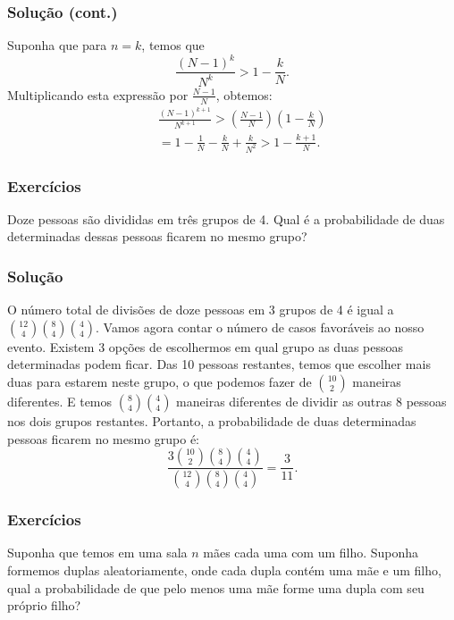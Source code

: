 \begin{frame}
\frametitle{\textbf{Solução (cont.)}}
\baselineskip=13pt

Suponha que para $n=k$, temos que
$$\frac{(N-1)^k}{N^k}>1-\frac{k}{N}.$$
Multiplicando esta expressão por $\frac{N-1}{N}$, obtemos:
\begin{eqnarray}
& & \frac{(N-1)^{k+1}}{N^{k+1}}>(\frac{N-1}{N})(1-\frac{k}{N})\nonumber\\
& & =1-\frac{1}{N}-\frac{k}{N}+\frac{k}{N^2}>1-\frac{k+1}{N}.\nonumber
\end{eqnarray}

\end{frame}

\begin{frame}
\frametitle{\textbf{Exercícios}}
\baselineskip=13pt


\begin{example}
Doze pessoas são divididas em três grupos de 4. Qual é a
probabilidade de duas determinadas dessas pessoas ficarem no mesmo
grupo?
\end{example}
\end{frame}


\begin{frame}
\frametitle{\textbf{Solução}}
\baselineskip=13pt

O número total de divisões de doze pessoas em 3
grupos de 4 é igual a $\binom{12}{4}\binom{8}{4}\binom{4}{4}$. Vamos
agora contar o número de casos favoráveis ao nosso evento. Existem 3
opções de escolhermos em qual grupo as duas pessoas determinadas
podem ficar. Das 10 pessoas restantes, temos que escolher mais duas
para estarem neste grupo, o que podemos fazer de $\binom{10}{2}$
maneiras diferentes. E temos $\binom{8}{4}\binom{4}{4}$ maneiras
diferentes de dividir as outras 8 pessoas nos dois grupos restantes.
Portanto, a probabilidade de duas determinadas pessoas ficarem no
mesmo grupo é:
$$\frac{3\binom{10}{2}\binom{8}{4}\binom{4}{4}}{\binom{12}{4}\binom{8}{4}\binom{4}{4}}=\frac{3}{11}.$$

\end{frame}

\begin{frame}
\frametitle{\textbf{Exercícios}}
\baselineskip=13pt


\begin{example}
Suponha que temos em uma sala $n$ mães cada uma com um filho. Suponha formemos duplas aleatoriamente, onde cada dupla contém uma mãe e um filho, qual a probabilidade de que pelo menos uma mãe forme uma dupla com seu próprio filho?
\end{example}

\end{frame}


